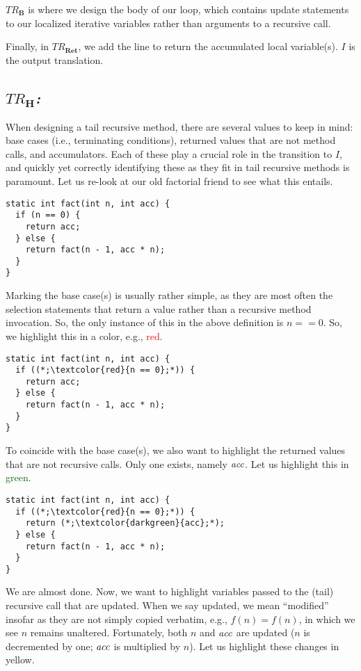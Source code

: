 \emph{$TR_\mathbf{B}$} is where we design the body of our loop, which contains update statements to our localized iterative variables rather than arguments to a recursive call.

Finally, in \emph{$TR_\mathbf{Ret}$}, we add the line to return the accumulated local variable(s). $I$ is the output translation.

\subsection{\emph{$TR_\mathbf{H}$:}} When designing a tail recursive method, there are several values to keep in mind: base cases (i.e., terminating conditions), returned values that are not method calls, and accumulators. Each of these play a crucial role in the transition to $I$, and quickly yet correctly identifying these as they fit in tail recursive methods is paramount. Let us re-look at our old factorial friend to see what this entails.

\begin{lstlisting}[language=MyJava]
static int fact(int n, int acc) {
  if (n == 0) {
    return acc;
  } else {
    return fact(n - 1, acc * n);
  }
}
\end{lstlisting}

Marking the base case(s) is usually rather simple, as they are most often the selection statements that return a value rather than a recursive method invocation. So, the only instance of this in the above definition is $n == 0$. So, we highlight this in a color, e.g., \textcolor{red}{red}.

\begin{lstlisting}[language=MyJava]
static int fact(int n, int acc) {
  if ((*;\textcolor{red}{n == 0};*)) {
    return acc;
  } else {
    return fact(n - 1, acc * n);
  }
}
\end{lstlisting}

To coincide with the base case(s), we also want to highlight the returned values that are not recursive calls. Only one exists, namely $\emph{acc}$. Let us highlight this in \textcolor{darkgreen}{green}.

\begin{lstlisting}[language=MyJava]
static int fact(int n, int acc) {
  if ((*;\textcolor{red}{n == 0};*)) {
    return (*;\textcolor{darkgreen}{acc};*);
  } else {
    return fact(n - 1, acc * n);
  }
}
\end{lstlisting}

We are almost done. Now, we want to highlight variables passed to the (tail) recursive call that are updated. When we say updated, we mean ``modified'' insofar as they are not simply copied verbatim, e.g., $f(n) = f(n)$, in which we see $n$ remains unaltered. Fortunately, both $n$ and $\emph{acc}$ are updated ($n$ is decremented by one; $\emph{acc}$ is multiplied by $n$). Let us highlight these changes in \textcolor{darkyellow}{yellow}. 

